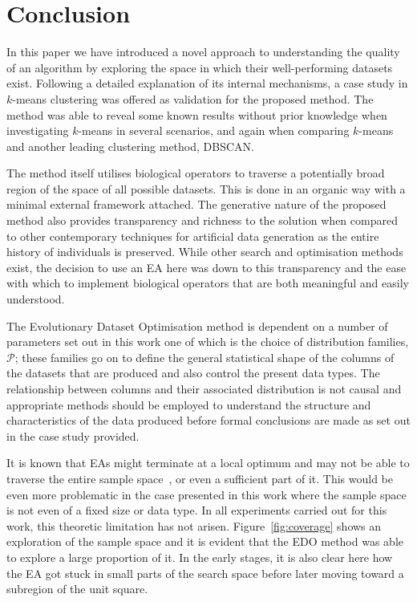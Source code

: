 \documentclass[11pt]{article}
\begin{document}
\section{Conclusion}

In this paper we have introduced a novel approach to understanding the quality
of an algorithm by exploring the space in which their well-performing datasets
exist. Following a detailed explanation of its internal mechanisms, a case study
in \(k\)-means clustering was offered as validation for the proposed method.
The method was able to reveal some known results without prior knowledge when
investigating \(k\)-means in several scenarios, and again when comparing
\(k\)-means and another leading clustering method, DBSCAN.\

The method itself utilises biological operators to traverse a potentially broad
region of the space of all possible datasets. This is done in an organic way
with a minimal external framework attached. The generative nature of the
proposed method also provides transparency and richness to the solution when
compared to other contemporary techniques for artificial data generation as the
entire history of individuals is preserved. While other search and optimisation
methods exist, the decision to use an EA here was down to this transparency and
the ease with which to implement biological operators that are both meaningful
and easily understood. 

The Evolutionary Dataset Optimisation method is dependent on a number of
parameters set out in this work one of which is the choice of distribution
families, \(\mathcal{P}\); these families go on to define the general
statistical shape of the columns of the datasets that are produced and also
control the present data types. The relationship between columns and their
associated distribution is not causal and appropriate methods should be employed
to understand the structure and characteristics of the data produced before
formal conclusions are made as set out in the case study provided.

It is known that EAs might terminate at a local optimum and may not be able to
traverse the entire sample space~\cite{Vikhar2016}, or even a sufficient part of
it. This would be even more problematic in the case presented in this work where
the sample space is not even of a fixed size or data type. In all experiments
carried out for this work, this theoretic limitation has not arisen.
Figure~\ref{fig:coverage} shows an exploration of the sample space and it is
evident that the EDO method was able to explore a large proportion of it. In the
early stages, it is also clear here how the EA got stuck in small parts of the
search space before later moving toward a subregion of the unit square.
\end{document}
